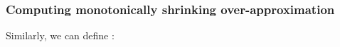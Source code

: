 \documentclass[conference]{IEEEtran}
\begin{document}
\subsubsection{Computing monotonically shrinking over-approximation}\label{subsub_loop}
Similarly,
we can define :
% 
% 
\end{document}
